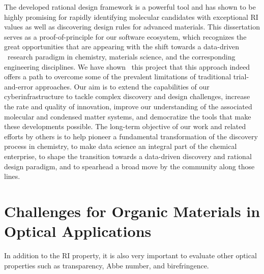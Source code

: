 The developed rational design framework is a powerful tool and has shown to be highly promising for rapidly identifying molecular candidates with exceptional RI values as well as discovering design rules for advanced materials. This dissertation serves as a proof-of-principle for our software ecosystem, which recognizes the great opportunities that are appearing with the shift towards a data-driven \insilico\ research paradigm in chemistry, materials science, and the corresponding engineering disciplines. We have shown \via\ this project that this approach indeed offers a path to overcome some of the prevalent limitations of traditional trial-and-error approaches. Our aim is to extend the capabilities of our cyberinfrastructure to tackle complex discovery and design challenges, increase the rate and quality of innovation, improve our understanding of the associated molecular and condensed matter systems, and democratize the tools that make these developments possible. The long-term objective of our work and related efforts by others is to help pioneer a fundamental transformation of the discovery process in chemistry, to make data science an integral part of the chemical enterprise, to shape the transition towards a data-driven discovery and rational design paradigm, and to spearhead a broad move by the community along those lines.

\section{Challenges for Organic Materials in Optical Applications}

In addition to the RI property, it is also very important to evaluate other optical properties such as transparency, Abbe number, and birefringence.

